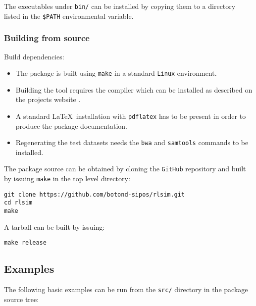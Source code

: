 The executables under \texttt{bin/} can be installed by copying them to a directory listed in the \texttt{\$PATH} environmental variable.


\subsubsection{Building from source}
\label{sss:build}

Build dependencies:

\begin{itemize}
\item The package is built using \texttt{make} in a standard \texttt{Linux} environment. 
\item Building the \rlsim tool requires the \go compiler which can be installed as described on the projects website \cite{goinstall}. 
\item A standard \LaTeX\ installation with \texttt{pdflatex} has to be present in order to produce the package documentation. 
\item Regenerating the test datasets needs the {\tt bwa} \cite{bwa} and {\tt samtools} \cite{samtools} commands to be installed.
\end{itemize}

The package source can be obtained by cloning the \texttt{GitHub} repository \cite{rlsim_repo} and built by issuing \texttt{make} in the top level directory:

\begin{verbatim}
git clone https://github.com/botond-sipos/rlsim.git
cd rlsim
make
\end{verbatim}

A tarball can be built by issuing:

\begin{verbatim}
make release
\end{verbatim}

\subsection{Examples}
\label{ss:examples}

The following basic examples can be run from the \texttt{src/} directory in the package source tree:

